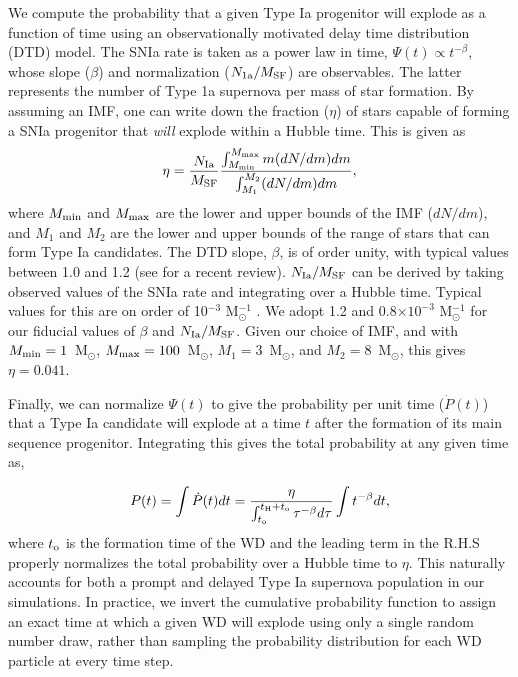 \documentclass[twocolumn]{aastex61}
\begin{document}
We compute the probability that a given Type Ia progenitor will explode as a function of time using an observationally motivated delay time distribution (DTD) model. 
The SNIa rate is taken as a power law in time, $\Psi (t) \propto t^{-\beta}$, whose slope ($\beta$) and normalization ($N_{\rm 1a}/M_{\rm SF}$) are observables. The latter represents the number of Type 1a supernova per mass of star formation. By assuming an IMF, one can write down the fraction ($\eta$) of stars capable of forming a SNIa progenitor that \textit{will} explode within a Hubble time. This is given as
\begin{equation}
\eta = \frac{N_{\rm Ia}}{M_{\rm SF}} \frac{\int_{M_{\rm min}}^{M_{\rm max}} m (dN/dm) dm }{\int_{M_{1}}^{M_{2}} (dN/dm) dm},
\end{equation}
where $M_{\rm min}$ and $M_{\rm max}$ are the lower and upper bounds of the IMF ($dN/dm$), and $M_{1}$ and $M_{2}$ are the lower and upper bounds of the range of stars that can form Type Ia candidates. The DTD slope, $\beta$, is of order unity, with typical values between 1.0 and 1.2 (see \citet{Maoz2014} for a recent review). $N_{\rm Ia}/M_{\rm SF}$ can be derived by taking observed values of the SNIa rate and integrating over a Hubble time. Typical values for this are on order of 10$^{-3}$ M$_{\odot}^{-1}$ \citep{Maoz2014}. We adopt 1.2 \citep{Maoz2010} and 0.8$\times 10^{-3}$ M$_{\odot}^{-1}$ \citep{GraurMaoz2013} for our fiducial values of $\beta$ and $N_{\rm Ia}/M_{\rm SF}$. Given our choice of IMF, and with $M_{\rm min} = 1$~M$_{\odot}$, $M_{\rm max}=100$~M$_{\odot}$, $M_{1}=3$~M$_{\odot}$, and $M_{2}=8$~M$_{\odot}$, this gives $\eta = 0.041$.

Finally, we can normalize $\Psi(t)$ to give the probability per unit time ($\dot{P}(t)$) that a Type Ia candidate will explode at a time $t$ after the formation of its main sequence progenitor. Integrating this gives the total probability at any given time as,

\begin{equation}
P(t) = \int \dot{P}(t)dt = \frac{\eta}{{ \int_{t_{\rm o}}^{t_{\rm H} + t_{\rm o}} \tau^{-\beta} d\tau}} \int t^{-\beta} dt,
\end{equation}
where $t_{\rm o}$ is the formation time of the WD and the leading term in the R.H.S properly normalizes the total probability over a Hubble time to $\eta$. This naturally accounts for both a prompt and delayed Type Ia supernova population in our simulations.
In practice, we invert the cumulative probability function to assign an exact time at which a given WD will explode using only a single random number draw, rather than sampling the probability distribution for each WD particle at every time step.
\end{document}
